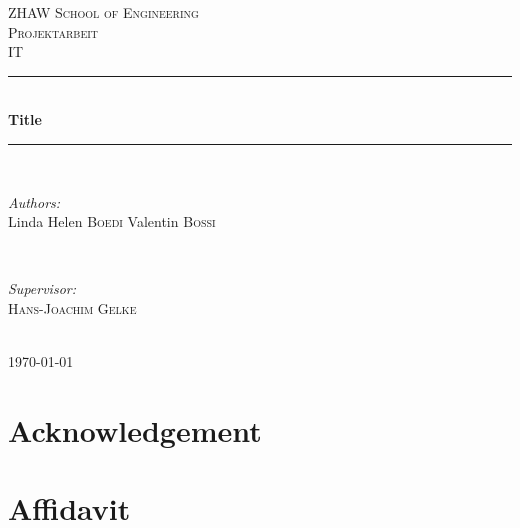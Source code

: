 \documentclass[12pt, a4paper]{report}
\begin{document}
    
    \begin{titlepage}
    
    \newcommand{\HRule}{\rule{\linewidth}{0.5mm}} %
    
    \center %
    
    \textsc{\LARGE ZHAW School of Engineering}\\[1.5cm] %
    \textsc{\Large Projektarbeit}\\[0.5cm] %
    \textsc{\large IT}\\[0.5cm] %
    
    \HRule \\[0.4cm]
    { \huge \bfseries Title}\\[0.4cm] %
    \HRule \\[1.5cm]
    
    
    \begin{minipage}{0.4\textwidth}
    \begin{flushleft} \large
    \emph{Authors:}\\
    Linda Helen \textsc{Boedi}  Valentin \textsc{Bossi} %
    \end{flushleft}
    \end{minipage}
    ~
    \begin{minipage}{0.4\textwidth}
    \begin{flushright} \large
    \emph{Supervisor:} \\
     \textsc{Hans-Joachim Gelke} %
    \end{flushright}
    \end{minipage}\\[2cm]
    
    
    {\large \today}\\[2cm] 
    
    
    \vfill 
    
    \end{titlepage}
    
    \chapter{Acknowledgement}
    
    \chapter{Affidavit}
    
\end{document}
